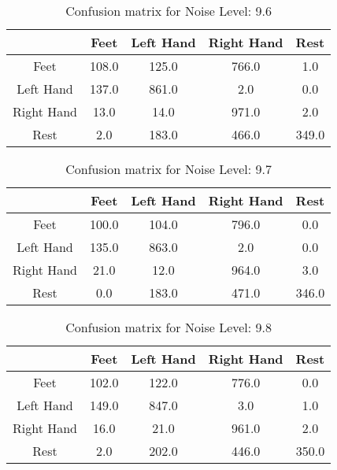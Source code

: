 \begin{table}[!htbp]
    \centering
    \begin{tabular}{|c||c|c|c|c|}
        \hline
		 & Feet & Left Hand & Right Hand & Rest \\
        \hline
        \hline
        Feet & 108.0 & 125.0 & 766.0 & 1.0 \\
        \hline
        Left Hand & 137.0 & 861.0 & 2.0 & 0.0 \\
        \hline
        Right Hand & 13.0 & 14.0 & 971.0 & 2.0 \\
        \hline
        Rest & 2.0 & 183.0 & 466.0 & 349.0 \\
        \hline
    \end{tabular}
    \caption{Confusion matrix for Noise Level: 9.6}
\end{table}

\begin{table}[!htbp]
    \centering
    \begin{tabular}{|c||c|c|c|c|}
        \hline
		 & Feet & Left Hand & Right Hand & Rest \\
        \hline
        \hline
        Feet & 100.0 & 104.0 & 796.0 & 0.0 \\
        \hline
        Left Hand & 135.0 & 863.0 & 2.0 & 0.0 \\
        \hline
        Right Hand & 21.0 & 12.0 & 964.0 & 3.0 \\
        \hline
        Rest & 0.0 & 183.0 & 471.0 & 346.0 \\
        \hline
    \end{tabular}
    \caption{Confusion matrix for Noise Level: 9.7}
\end{table}

\begin{table}[!htbp]
    \centering
    \begin{tabular}{|c||c|c|c|c|}
        \hline
		 & Feet & Left Hand & Right Hand & Rest \\
        \hline
        \hline
        Feet & 102.0 & 122.0 & 776.0 & 0.0 \\
        \hline
        Left Hand & 149.0 & 847.0 & 3.0 & 1.0 \\
        \hline
        Right Hand & 16.0 & 21.0 & 961.0 & 2.0 \\
        \hline
        Rest & 2.0 & 202.0 & 446.0 & 350.0 \\
        \hline
    \end{tabular}
    \caption{Confusion matrix for Noise Level: 9.8}
\end{table}

